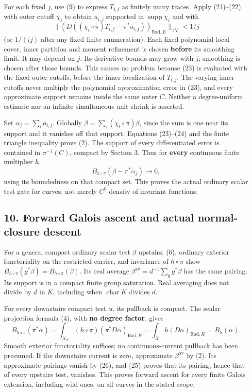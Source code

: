 \documentclass[11pt]{article}
\begin{document}
For each fixed \(j\), use (9) to express \(T_{i,j}\) as finitely many
traces. Apply (21)--(22) with outer cutoff \(\chi_i\) to obtain
\(a_{i,j}\) supported in \(\operatorname{supp}\chi_i\) and with \[
 \big\|(D((\chi_i\circ\pi)T_{i,j}-\pi^*a_{i,j}))_{
                     \mathrm{Rad},E}\big\|_{\mathrm{TV}}<1/j       \tag{24}
\] (or \(1/(ij)\) after any fixed finite enumeration). Each
fixed-polynomial local cover, inner partition and moment refinement is
chosen \textbf{before} its smoothing limit. It may depend on \(j\). Its
derivative bounds may grow with \(j\); smoothing is chosen after those
bounds. This causes no problem because (23) is evaluated with the fixed
outer cutoffs, before the inner localization of \(T_{i,j}\). The varying
inner cutoffs never multiply the polynomial approximation error in (23),
and every approximate support remains inside the same outer \(C\).
Neither a degree-uniform estimate nor an infinite simultaneous unit
shrink is asserted.

Set \(\alpha_j=\sum_i a_{i,j}\). Globally
\(\beta=\sum_i(\chi_i\circ\pi)\beta\), since the sum is one near its
support and it vanishes off that support. Equations (23)--(24) and the
finite triangle inequality prove (2). The support of every
differentiated error is contained in \(\pi^{-1}(C)\), compact by Section
3. Thus for \textbf{every} continuous finite multiplier \(h\), \[
       B_{h\circ\pi}(\beta-\pi^*\alpha_j)\longrightarrow0,
                                                               \tag{25}
\] using its boundedness on that compact set. This proves the actual
ordinary scalar test gate for curves, not merely \(C^0\) density of
invariant functions.

\subsection{10. Forward Galois ascent and actual normal-closure
descent}\label{forward-galois-ascent-and-actual-normal-closure-descent}

For a general compact ordinary scalar test \(\beta\) upstairs, (6),
ordinary exterior functoriality on the restricted carrier, and
invariance of \(h\circ\pi\) show
\(B_{h\circ\pi}(g^*\beta)=B_{h\circ\pi}(\beta)\). Its real average
\(\beta^{\mathrm{av}}=d^{-1}\sum_g g^*\beta\) has the same pairing. Its
support is in a compact finite group saturation. Real averaging does not
divide by \(d\) in \(K\), including when \(\operatorname{char}K\)
divides \(d\).

For every downstairs compact test \(\alpha\), its pullback is compact.
The scalar projection formula (4), with \textbf{no degree factor}, gives
\[
  B_{h\circ\pi}(\pi^*\alpha)
     =\int_{X_E}(h\circ\pi)(\pi^*D\alpha)_{\mathrm{Rad},E}
     =\int_X h(D\alpha)_{\mathrm{Rad},K}=B_h(\alpha).     \tag{26}
\] Smooth exterior functoriality suffices; no continuous-current
pullback has been presumed. If the downstairs current is zero,
approximate \(\beta^{\mathrm{av}}\) by (2). Its approximate pairings
vanish by (26), and (25) proves that its pairing, hence that of every
upstairs test, vanishes. This proves forward ascent for every finite
Galois extension, including wild ones, on all curves in the stated
scope.
\end{document}
